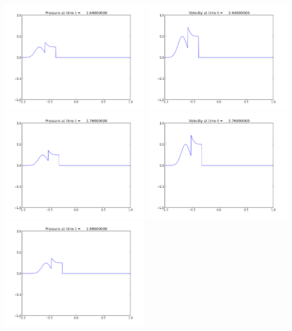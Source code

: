 \documentclass[11pt]{article}
\begin{document}
\vskip 10pt 
\includegraphics[width=0.475\textwidth]{frame0022fig1.png}
\includegraphics[width=0.475\textwidth]{frame0022fig2.png}
\vskip 10pt 
\includegraphics[width=0.475\textwidth]{frame0023fig1.png}
\includegraphics[width=0.475\textwidth]{frame0023fig2.png}
\vskip 10pt 
\includegraphics[width=0.475\textwidth]{frame0024fig1.png}
\end{document}
